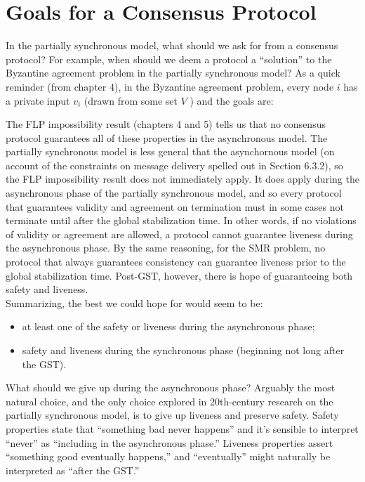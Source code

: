 \section{Goals for a Consensus Protocol}
In the partially synchronous model, what should we ask for from a consensus protocol? For
example, when should we deem a protocol a “solution” to the Byzantine agreement problem
in the partially synchronous model? As a quick reminder (from chapter 4), in the Byzantine
agreement problem, every node $i$ has a private input $v_i$ (drawn from some set $V$ ) and the
goals are:

The FLP impossibility result (chapters 4 and 5) tells us that no consensus protocol guarantees all of these properties in the asynchronous model. The partially synchronous model is
less general that the asynchornous model (on account of the constraints on message delivery
spelled out in Section 6.3.2), so the FLP impossibility result does not immediately apply.
It does apply during the asynchronous phase of the partially synchronous model, and so every
protocol that guarantees validity and agreement on termination must in some cases not terminate until after the global stabilization time. In other words, if no violations of validity or
agreement are allowed, a protocol cannot guarantee liveness during the asynchronous phase.
By the same reasoning, for the SMR problem, no protocol that always guarantees consistency
can guarantee liveness prior to the global stabilization time. Post-GST, however, there is
hope of guaranteeing both safety and liveness.\\

Summarizing, the best we could hope for would seem to be:
\begin{itemize}
    \item at least one of the safety or liveness during the asynchronous phase;
    \item safety and liveness during the synchronous phase (beginning not long after the GST).
\end{itemize}
What should we give up during the asynchronous phase? Arguably the most natural choice,
and the only choice explored in 20th-century research on the partially synchronous model,
is to give up liveness and preserve safety. Safety properties state that “something bad never
happens” and it’s sensible to interpret “never” as “including in the asynchronous phase.”
Liveness properties assert “something good eventually happens,” and “eventually” might
naturally be interpreted as “after the GST.”


